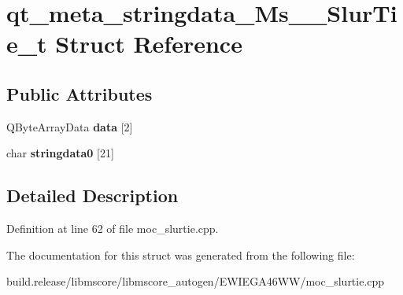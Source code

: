 \hypertarget{structqt__meta__stringdata___ms_____slur_tie__t}{}\section{qt\+\_\+meta\+\_\+stringdata\+\_\+\+Ms\+\_\+\+\_\+\+Slur\+Tie\+\_\+t Struct Reference}
\label{structqt__meta__stringdata___ms_____slur_tie__t}
\subsection*{Public Attributes}
\begin{DoxyCompactItemize}
\item 
\mbox{\label{structqt__meta__stringdata___ms_____slur_tie__t_a314cc5a977177e869fe9c2d12ada1626}} 
Q\+Byte\+Array\+Data {\bfseries data} \mbox{[}2\mbox{]}
\item 
\mbox{\label{structqt__meta__stringdata___ms_____slur_tie__t_a1ea63e5d2a49d562463fcb0066e959b1}} 
char {\bfseries stringdata0} \mbox{[}21\mbox{]}
\end{DoxyCompactItemize}


\subsection{Detailed Description}


Definition at line 62 of file moc\+\_\+slurtie.\+cpp.



The documentation for this struct was generated from the following file\+:\begin{DoxyCompactItemize}
\item 
build.\+release/libmscore/libmscore\+\_\+autogen/\+E\+W\+I\+E\+G\+A46\+W\+W/moc\+\_\+slurtie.\+cpp\end{DoxyCompactItemize}
